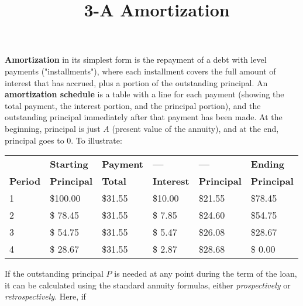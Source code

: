 \documentclass[12pt]{article}
\title{\normalfont\ 3-A Amortization} %
\author{} %
\date{}  %
\begin{document}

\maketitle %
\vspace{-1.1in}

\begin{flushleft}
    \textbf{Amortization} in its simplest form is the repayment of a debt with level payments ("installments"),
    where each installment covers the full amount of interest that has accrued, plus a portion of the outstanding
    principal.  An \textbf{amortization schedule} is a table with a line for each payment (showing the
    total payment, the interest portion, and the principal portion), and the outstanding principal immediately after
    that payment has been made.  At the beginning, principal is just $ A $ (present value of the annuity), and at
    the end, principal goes to 0.  To illustrate:
\end{flushleft}

\begin{tabular}{@{ } l l  l  l l l @{ }}    %
    \toprule
    {\bfseries       }&{\bfseries Starting }&{\bfseries Payment}&{\bfseries ---}&{\bfseries ---}&{\bfseries Ending} \\
    {\bfseries Period}&{\bfseries Principal}&{\bfseries Total}&{\bfseries Interest}&{\bfseries Principal}&{\bfseries Principal} \\
    \cmidrule(lr){1-6}
    1 & \$100.00  & \$31.55 &\$10.00 &\$21.55 &\$78.45 \\
    2 & \$ 78.45  & \$31.55 &\$ 7.85 &\$24.60 &\$54.75 \\
    3 & \$ 54.75  & \$31.55 &\$ 5.47 &\$26.08 &\$28.67 \\
    4 & \$ 28.67  & \$31.55 &\$ 2.87 &\$28.68 &\$ 0.00 \\
    \bottomrule
\end{tabular}

\begin{flushleft}
    If the outstanding principal $ P $ is needed at any point during the term of
    the loan, it can be calculated using the standard annuity formulas, either \textit{prospectively} or
    \textit{retrospectively}.  Here, if
\end{flushleft}
\end{document}
